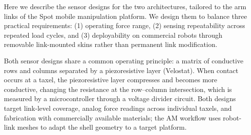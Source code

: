 




Here we describe the sensor designs for the two architectures, tailored to the arm links of the Spot mobile manipulation platform. We design them to balance three practical requirements: (1) operating force range, (2) sensing repeatability across repeated load cycles, and (3) deployability on commercial robots through removable link-mounted skins rather than permanent link modification.

Both sensor designs share a common operating principle: a matrix of conductive rows and columns separated by a piezoresistive layer (Velostat). When contact occurs at a taxel, the piezoresistive layer compresses and becomes more conductive, changing the resistance at the row–column intersection, which is measured by a microcontroller through a voltage divider circuit. Both designs target link-level coverage, analog force readings across individual taxels, and fabrication with commercially available materials; the AM workflow uses robot-link meshes to adapt the shell geometry to a target platform.

